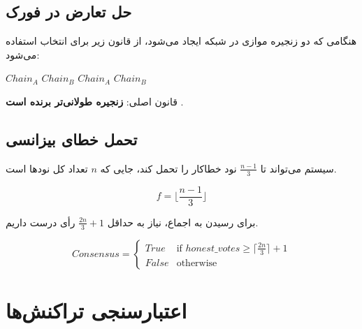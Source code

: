 \subsection{حل تعارض در فورک }

هنگامی که دو زنجیره موازی در شبکه ایجاد می‌شود، از قانون زیر برای انتخاب استفاده می‌شود:

\begin{latin}
\begin{algorithm}[H]
\caption{Fork Resolution Algorithm}
\begin{algorithmic}[1]
    \RETURN $Chain_A$
    \RETURN $Chain_B$
\ELSE
        \RETURN $Chain_A$
    \ELSE
        \RETURN $Chain_B$
    \ENDIF
\ENDIF
\end{algorithmic}
\end{algorithm}
\end{latin}

قانون اصلی: \textbf{زنجیره طولانی‌تر برنده است} .

\subsection{تحمل خطای بیزانسی }

سیستم می‌تواند تا $\frac{n-1}{3}$ نود خطاکار را تحمل کند، جایی که $n$ تعداد کل نودها است.

\begin{latin}
\begin{equation}
f = \lfloor \frac{n-1}{3} \rfloor
\end{equation}
\end{latin}

برای رسیدن به اجماع، نیاز به حداقل $\frac{2n}{3} + 1$ رأی درست داریم.

\begin{latin}
\begin{equation}
Consensus = \begin{cases} 
True & \text{if } honest\_votes \geq \lceil \frac{2n}{3} \rceil + 1 \\
False & \text{otherwise}
\end{cases}
\end{equation}
\end{latin}

\section{اعتبارسنجی تراکنش‌ها }


